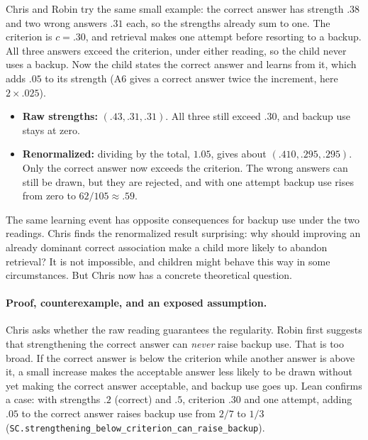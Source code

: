 \documentclass[11pt]{article}
\newcommand{\lean}[1]{\texttt{#1}}
\begin{document}
Chris and Robin try the same small example: the correct answer has strength $.38$ and two wrong answers $.31$ each, so the strengths already sum to one. The criterion is $c=.30$, and retrieval makes one attempt before resorting to a backup. All three answers exceed the criterion, under either reading, so the child never uses a backup. Now the child states the correct answer and learns from it, which adds $.05$ to its strength (A6 gives a correct answer twice the increment, here $2 \times .025$).
\begin{itemize}
  \item \textbf{Raw strengths:} $(.43, .31, .31)$. All three still exceed $.30$, and backup use stays at zero.
  \item \textbf{Renormalized:} dividing by the total, $1.05$, gives about $(.410, .295, .295)$. Only the correct answer now exceeds the criterion. The wrong answers can still be drawn, but they are rejected, and with one attempt backup use rises from zero to $62/105 \approx .59$.
\end{itemize}
The same learning event has opposite consequences for backup use under the two readings. Chris finds the renormalized result surprising: why should improving an already dominant correct association make a child more likely to abandon retrieval? It is not impossible, and children might behave this way in some circumstances. But Chris now has a concrete theoretical question.

\paragraph{Proof, counterexample, and an exposed assumption.} Chris asks whether the raw reading guarantees the regularity. Robin first suggests that strengthening the correct answer can \emph{never} raise backup use. That is too broad. If the correct answer is below the criterion while another answer is above it, a small increase makes the acceptable answer less likely to be drawn without yet making the correct answer acceptable, and backup use goes up. Lean confirms a case: with strengths $.2$ (correct) and $.5$, criterion $.30$ and one attempt, adding $.05$ to the correct answer raises backup use from $2/7$ to $1/3$ (\lean{SC.strengthening\_below\_criterion\_can\_raise\_backup}).
\end{document}
